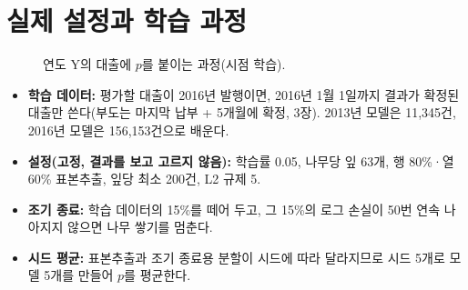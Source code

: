 \section{실제 설정과 학습 과정}
\begin{figure}[H]\centering
{}
\caption{연도 Y의 대출에 $p$를 붙이는 과정(시점 학습).}
\end{figure}

\begin{itemize}[leftmargin=*]
\item \textbf{학습 데이터:} 평가할 대출이 2016년 발행이면, 2016년 1월 1일까지 결과가 확정된 대출만 쓴다(부도는 마지막 납부 + 5개월에 확정, 3장). 2013년 모델은 11,345건, 2016년 모델은 156,153건으로 배운다.
\item \textbf{설정(고정, 결과를 보고 고르지 않음):} 학습률 0.05, 나무당 잎 63개, 행 80\%·\allowbreak{}열 60\% 표본추출, 잎당 최소 200건, L2 규제 5.
\item \textbf{조기 종료:} 학습 데이터의 15\%를 떼어 두고, 그 15\%의 로그 손실이 50번 연속 나아지지 않으면 나무 쌓기를 멈춘다.
\item \textbf{시드 평균:} 표본추출과 조기 종료용 분할이 시드에 따라 달라지므로 시드 5개로 모델 5개를 만들어 $p$를 평균한다.
\end{itemize}

